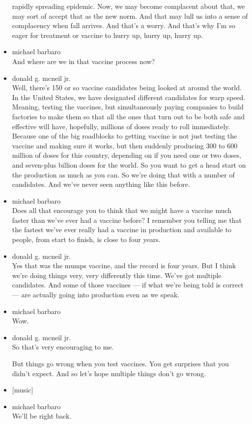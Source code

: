 \begin{itemize}
  rapidly spreading epidemic. Now, we may become complacent about that,
  we may sort of accept that as the new norm. And that may lull us into
  a sense of complacency when fall arrives. And that's a worry. And
  that's why I'm so eager for treatment or vaccine to hurry up, hurry
  up, hurry up.
\item
  michael barbaro\\
  And where are we in that vaccine process now?
\item
  donald g. mcneil jr.\\
  Well, there's 150 or so vaccine candidates being looked at around the
  world. In the United States, we have designated different candidates
  for warp speed. Meaning, testing the vaccines, but simultaneously
  paying companies to build factories to make them so that all the ones
  that turn out to be both safe and effective will have, hopefully,
  millions of doses ready to roll immediately. Because one of the big
  roadblocks to getting vaccine is not just testing the vaccine and
  making sure it works, but then suddenly producing 300 to 600 million
  of doses for this country, depending on if you need one or two doses,
  and seven-plus billion doses for the world. So you want to get a head
  start on the production as much as you can. So we're doing that with a
  number of candidates. And we've never seen anything like this before.
\item
  michael barbaro\\
  Does all that encourage you to think that we might have a vaccine much
  faster than we've ever had a vaccine before? I remember you telling me
  that the fastest we've ever really had a vaccine in production and
  available to people, from start to finish, is close to four years.
\item
  donald g. mcneil jr.\\
  Yes that was the mumps vaccine, and the record is four years. But I
  think we're doing things very, very differently this time. We've got
  multiple candidates. And some of those vaccines --- if what we're
  being told is correct --- are actually going into production even as
  we speak.
\item
  michael barbaro\\
  Wow.
\item
  donald g. mcneil jr.\\
  So that's very encouraging to me.

  But things go wrong when you test vaccines. You get surprises that you
  didn't expect. And so let's hope multiple things don't go wrong.
\item
  {[}music{]}
\item
  michael barbaro\\
  We'll be right back.


\end{itemize}
